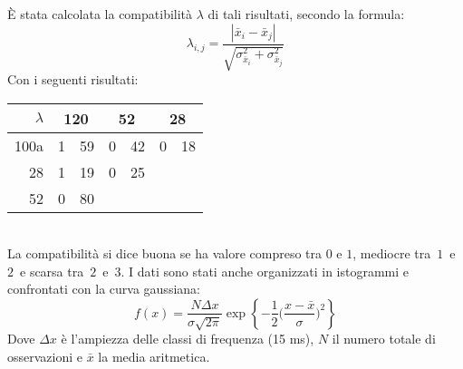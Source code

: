 \documentclass[italian,a4paper,10pt]{article}
\theoremstyle{definition}
\begin{document}
\`{E} stata calcolata la compatibilità $\lambda$ di tali risultati, secondo la formula:
\begin{equation*}
 \lambda_{i,j} = \dfrac{|\bar{x}_i - \bar{x}_j|}{\sqrt{\sigma_{\bar{x}_i}^2 + \sigma_{\bar{x}_j}^2}}
\end{equation*}
Con i seguenti risultati:
\begin{table}[h]\centering
\begin{tabular}{@{}r|r@{.}l r@{.}l r@{.}l}
 $\lambda$	&
 \multicolumn{2}{c}{120}
&   \multicolumn{2}{c}{52}
&   \multicolumn{2}{c}{28}  		\\
 \hline
 100a 		&  1&59 	&  0&42 	& 0&18 		\\
 28   		&  1&19 	&  0&25 	& \multicolumn{2}{c}{} \\
 52  	 	&  0&80 	& \multicolumn{2}{c}{}	& \multicolumn{2}{c}{}		 \\
\end{tabular}
\end{table}\\
La compatibilità si dice buona se ha valore compreso tra $0$ e $1$, mediocre tra~$1$~e~$2$~e scarsa tra~$2$~e~$3$.
I dati sono stati anche organizzati in istogrammi e confrontati con la curva gaussiana:
\begin{equation*}
 f(x) = \dfrac{N\Delta x}{\sigma \sqrt{2\pi}}\exp \left\{-\dfrac 1 2 \Big({\dfrac{x-\bar{x}}{\sigma}}\Big)^2\right\}
\end{equation*}
Dove $\Delta x$ è l'ampiezza delle classi di frequenza (15 ms), $N$ il numero totale di osservazioni e $\bar{x}$ la media aritmetica.
\end{document}
